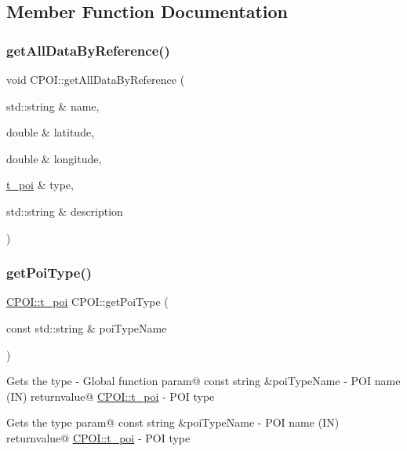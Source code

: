 \subsection{Member Function Documentation}
\mbox{\label{classCPOI_a65c0161ce80d49cf5f2fe80765bc94d9}} 
\subsubsection{\texorpdfstring{get\+All\+Data\+By\+Reference()}{getAllDataByReference()}}
{\footnotesize\ttfamily void C\+P\+O\+I\+::get\+All\+Data\+By\+Reference (\begin{DoxyParamCaption}\item[{std\+::string \&}]{name,  }\item[{double \&}]{latitude,  }\item[{double \&}]{longitude,  }\item[{\hyperlink{classCPOI_a4b95e2e14055d2f9ca134e474dd4a19f}{t\+\_\+poi} \&}]{type,  }\item[{std\+::string \&}]{description }\end{DoxyParamCaption})}

\mbox{\label{classCPOI_ac100f8c90fe0e5057e6fa4eca53126ad}} 
\subsubsection{\texorpdfstring{get\+Poi\+Type()}{getPoiType()}}
{\footnotesize\ttfamily \hyperlink{classCPOI_a4b95e2e14055d2f9ca134e474dd4a19f}{C\+P\+O\+I\+::t\+\_\+poi} C\+P\+O\+I\+::get\+Poi\+Type (\begin{DoxyParamCaption}\item[{const std\+::string \&}]{poi\+Type\+Name }\end{DoxyParamCaption})\hspace{0.3cm}{\ttfamily [static]}}

Gets the type -\/ Global function param@ const string \&poi\+Type\+Name -\/ P\+OI name (IN) returnvalue@ \hyperlink{classCPOI_a4b95e2e14055d2f9ca134e474dd4a19f}{C\+P\+O\+I\+::t\+\_\+poi} -\/ P\+OI type

Gets the type param@ const string \&poi\+Type\+Name -\/ P\+OI name (IN) returnvalue@ \hyperlink{classCPOI_a4b95e2e14055d2f9ca134e474dd4a19f}{C\+P\+O\+I\+::t\+\_\+poi} -\/ P\+OI type \mbox{\label{classCPOI_a908fcdd7b79aca230c67c05bf1b1a78c}} 
